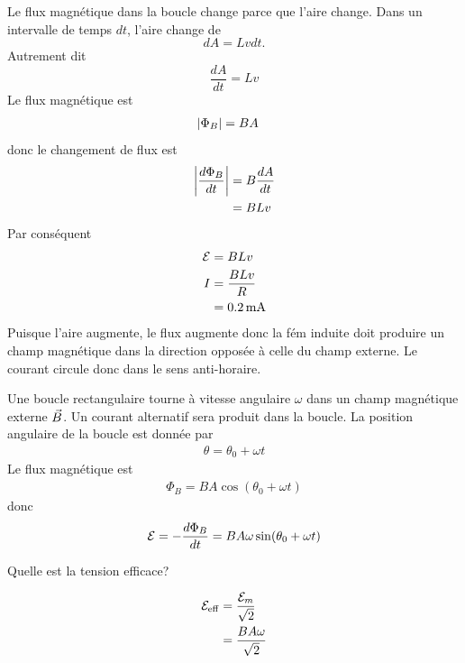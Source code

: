 \begin{reponsebox}
Le flux magnétique dans la boucle change parce que l'aire change. Dans un
intervalle de temps $dt$, l'aire change de
$$dA = Lvdt.$$
Autrement dit
$$\frac{dA}{dt} = Lv$$
Le flux magnétique est
\begin{align*}
  \left| \Phi_B \right| &= BA
\end{align*}
donc le changement de flux est 
\begin{align*}
  \left| \frac{d\Phi_B}{dt} \right| &= B \frac{dA}{dt} \\
      &= BLv
\end{align*}
Par conséquent
\begin{align*}
  \mathcal{E} &= BLv \\
  I &= \frac{BLv}{R} \\
    &= \SI{0.2}{mA}
\end{align*}
Puisque l'aire augmente, le flux augmente donc la fém induite doit produire un
champ magnétique dans la direction opposée à celle du champ externe. Le courant
circule donc dans le sens anti-horaire.
\end{reponsebox}



Une boucle rectangulaire tourne à vitesse angulaire $\omega$ dans un champ
magnétique externe $\vec{B}$. Un courant alternatif sera produit dans la boucle.
La position angulaire de la boucle est donnée par
\begin{align*}
  \theta = \theta_0 + \omega t
\end{align*}
Le flux magnétique est
\begin{align*}
  \Phi_B = BA \cos(\theta_0 + \omega t)
\end{align*}
donc
\begin{align*}
  \mathcal{E} = -\frac{d\Phi_B}{dt} = BA\omega \sin(\theta_0 + \omega t)
\end{align*}

Quelle est la tension efficace?

\begin{align*}
  \mathcal{E}_\mathrm{eff} &= \frac{\mathcal{E}_m}{\sqrt{2}} \\
                    &= \frac{BA\omega}{\sqrt{2}} 
\end{align*}

